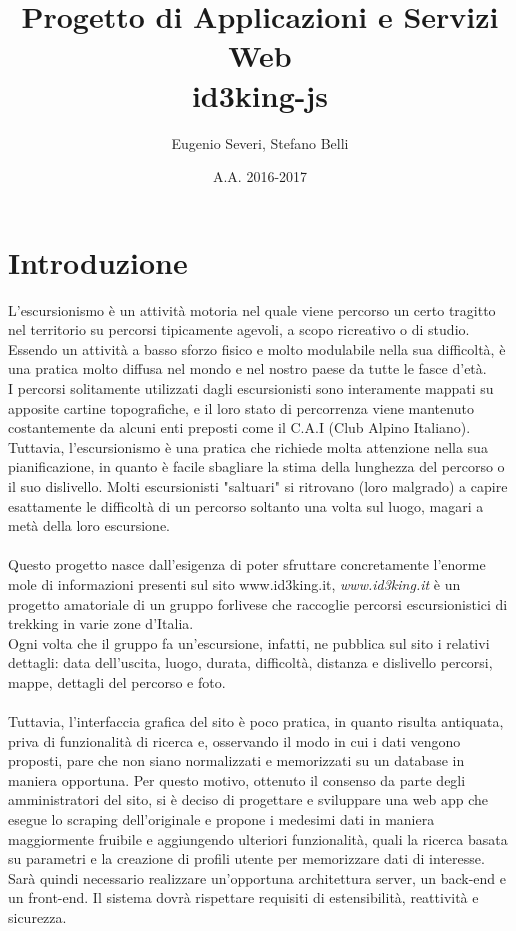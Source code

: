 \documentclass[11pt]{report}
\begin{document}
\title{Progetto di Applicazioni e Servizi Web\\id3king-js}
\author{Eugenio Severi, Stefano Belli}
\date{A.A. 2016-2017}
\begin{titlepage}
	\maketitle
\end{titlepage}

\setcounter{chapter}{1}
\section{Introduzione}
L'escursionismo è un attività motoria nel quale viene percorso un certo tragitto nel territorio su percorsi tipicamente agevoli, a scopo ricreativo o di studio.
\\Essendo un attività a basso sforzo fisico e molto modulabile nella sua difficoltà, è una pratica molto diffusa nel mondo e nel nostro paese da tutte le fasce d'età.\\ 
I percorsi solitamente utilizzati dagli escursionisti sono interamente mappati su apposite cartine topografiche, e il loro stato di percorrenza viene mantenuto costantemente da alcuni enti preposti come il C.A.I (Club Alpino Italiano).
\\Tuttavia, l'escursionismo è una pratica che richiede molta attenzione nella sua pianificazione, in quanto è facile sbagliare la stima della lunghezza del percorso o il suo dislivello. Molti escursionisti "saltuari" si ritrovano (loro malgrado) a capire esattamente le difficoltà di un percorso soltanto una volta sul luogo, magari a metà della loro escursione.
\\\\Questo progetto nasce dall'esigenza di poter sfruttare concretamente l'enorme mole di informazioni presenti sul sito www.id3king.it, 
\textit{www.id3king.it} è un progetto amatoriale di un gruppo forlivese che raccoglie percorsi escursionistici di trekking in varie zone d'Italia.
\\Ogni volta che il gruppo fa un'escursione, infatti, ne pubblica sul sito i relativi dettagli: data dell'uscita, luogo, durata, difficoltà, distanza e dislivello percorsi, mappe, dettagli del percorso e foto.
\\\\Tuttavia, l'interfaccia grafica del sito è poco pratica, in quanto risulta antiquata, priva di funzionalità di ricerca e, osservando il modo in cui i dati vengono proposti, pare che non siano normalizzati e memorizzati su un database in maniera opportuna.
Per questo motivo, ottenuto il consenso da parte degli amministratori del sito, si è deciso di progettare e sviluppare una web app che esegue lo scraping dell'originale e propone i medesimi dati in maniera maggiormente fruibile e aggiungendo ulteriori funzionalità, quali la ricerca basata su parametri e la creazione di profili utente per memorizzare dati di interesse.
\\Sarà quindi necessario realizzare un'opportuna architettura server, un back-end e un front-end. Il sistema dovrà rispettare requisiti di estensibilità, reattività e sicurezza.
\end{document}
